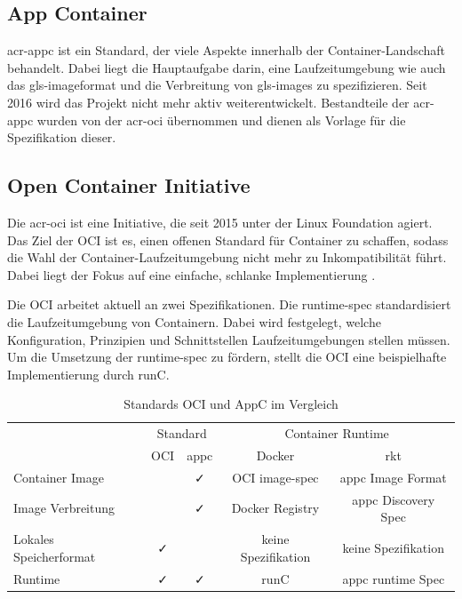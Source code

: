 \subsection{App Container}
\label{sec:appc}
\gls{acr-appc} ist ein Standard, der viele Aspekte innerhalb der Container-Landschaft behandelt. Dabei liegt die Hauptaufgabe darin, eine Laufzeitumgebung wie auch das \gls{gls-image}format und die Verbreitung von \glspl{gls-image} zu spezifizieren. Seit 2016 wird das Projekt nicht mehr aktiv weiterentwickelt. Bestandteile der \gls{acr-appc} wurden von der \gls{acr-oci} übernommen und dienen als Vorlage für die Spezifikation dieser.

\subsection{Open Container Initiative}
\label{sec:oci}
Die \gls{acr-oci} ist eine Initiative, die seit 2015 unter der Linux Foundation agiert. Das Ziel der OCI ist es, einen offenen Standard für Container zu schaffen, sodass die Wahl der Container-Laufzeitumgebung nicht mehr zu Inkompatibilität führt. Dabei liegt der Fokus auf eine einfache, schlanke Implementierung \citep{OpenContainerInitiative}.

Die OCI arbeitet aktuell an zwei Spezifikationen. Die runtime-spec standardisiert die Laufzeitumgebung  von Containern. Dabei wird festgelegt, welche Konfiguration, Prinzipien und Schnittstellen Laufzeitumgebungen stellen müssen. Um die Umsetzung der runtime-spec zu fördern, stellt die OCI eine beispielhafte Implementierung durch runC.

\begin{table}[h]
	\begin{center}
		\begin{tabular}{lcccc}
			\toprule
			& \multicolumn{2}{c}{Standard} & \multicolumn{2}{c}{Container Runtime}\\
			\cmidrule{2-5}
			& OCI		& appc		& Docker			& rkt					\\
			\midrule
			Container Image			& \faTimes	& \faCheck	& OCI image-spec 	& appc Image Format		\\
			Image Verbreitung		& \faTimes	& \faCheck	& Docker Registry	& appc Discovery Spec 	\\
			Lokales Speicherformat	& \faCheck	& \faTimes	& keine Spezifikation& keine Spezifikation	\\
			\midrule
			Runtime					& \faCheck	& \faCheck	& runC 				& appc runtime Spec		\\
			\bottomrule
		\end{tabular}
	\end{center}
	\caption{Standards OCI und AppC im Vergleich \citep{MakingSenseofContainerStandardsandFoundations:OCICNCFAppcandRkt}}
	\label{tab:ociVSappc}
\end{table}

